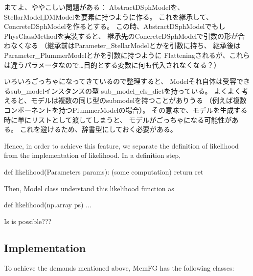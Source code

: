 \begin{DoxyVerb}
 まてよ、ややこしい問題がある：
 AbstractDSphModelを、StellarModel,DMModelを要素に持つように作る。
 これを継承して、ConcreteDSphModelを作るとする。
 この時、AbstractDSphModelでもしPhysClassMethodを実装すると、
 継承先のConcreteDSphModelで引数の形が合わなくなる
 （継承前はParameter_StellarModelとかを引数に持ち、
 継承後はParameter_PlummerModelとかを引数に持つように
 Flatteningされるが、これらは違うパラメータなので…目的とする変数に何も代入されなくなる？）

 いろいろごっちゃになってきているので整理すると、
 Modelそれ自体は受容できるsub_modelインスタンスの型
 sub_model_cls_dictを持っている。
 よくよく考えると、モデルは複数の同じ型のsubmodelを持つことがありうる
 （例えば複数コンポーネントを持つPlummerModelの場合）。
 その意味で、モデルを生成する時に単にリストとして渡してしまうと、
 モデルがごっちゃになる可能性がある。
 これを避けるため、辞書型にしておく必要がある。
\end{DoxyVerb}


Hence, in order to achieve this feature, we separate the definition of likelihood from the implementation of likelihood. In a definition step,


\begin{DoxyCode}
def likelihood(Parameters params):
    (some computation)
    return ret
\end{DoxyCode}


Then, Model class understand this likelihood function as


\begin{DoxyCode}
def likelihood(np.array ps)
    ...
\end{DoxyCode}


Is is possible???

\subsection*{Implementation}

To achieve the demands mentioned above, Mem\+FG has the following classes\+:


